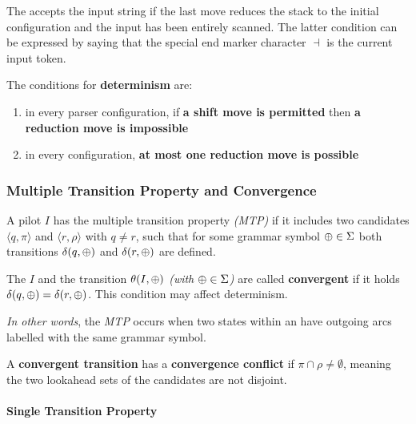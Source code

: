 \documentclass[english]{article}
\begin{document}
The \PDA accepts the input string if the last move reduces the stack to the initial configuration and the input has been entirely scanned.
The latter condition can be expressed by saying that the special end marker character \(\dashv\) is the current input token.

\bigskip
The conditions for \textbf{determinism} are:

\begin{enumerate}
  \item in every parser configuration, if \textbf{a shift move is permitted} then \textbf{a reduction move is impossible}
  \item in every configuration, \textbf{at most one reduction move is possible}
\end{enumerate}

\subsubsection{Multiple Transition Property and Convergence}
\label{sec:multiple-transition-property-and-convergence}

\begin{definition}
  A pilot \mstate \(I\) has the multiple transition property \textit{(MTP)} if it includes two candidates \(\langle q, \pi \rangle\) and \(\langle r, \rho\rangle\) with \(q \neq r\), such that for some grammar symbol \(\oplus \in \Sigma\) both transitions \(\delta(q, \oplus)\) and \(\delta(r, \oplus)\) are defined.
\end{definition}

\begin{definition}
  The \mstate \(I\) and the transition \(\theta(I, \oplus)\) \textit{(with \(\oplus \in \Sigma\))} are called \textbf{convergent} if it holds \(\delta(q, \oplus) = \delta(r, \oplus)\).
  This condition may affect determinism.
\end{definition}

\textit{In other words}, the \textit{MTP} occurs when two states within an \mstate have outgoing arcs labelled with the same grammar symbol.

A \textbf{convergent transition} has a \textbf{convergence conflict} if \(\pi \cap \rho \neq \emptyset\), meaning the two lookahead sets of the candidates are not disjoint.

\paragraph{Single Transition Property}
\end{document}
